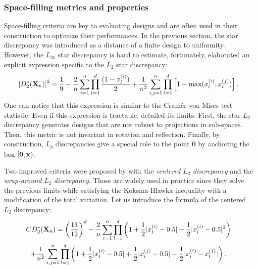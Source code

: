 \subsubsection{Space-filling metrics and properties}
Space-filling criteria are key to evaluating designs and are often used in their construction to optimize their performances. 
In the previous section, the star discrepancy was introduced as a distance of a finite design to uniformity.
However, the $L_\infty$ star discrepancy is hard to estimate, fortunately, \citet{warnock_1972} elaborated an explicit expression specific to the $L_2$ star discrepancy: 
\begin{equation}
    \left[D^*_2({\bf X}_n)\right]^2 = \frac19 - \frac2n \sum_{i=1}^{n} \prod_{l=1}^{d} \frac{(1-x_l^{(i)})}{2} + \frac{1}{n^2}\sum_{i,j=1}^{n} \prod_{l=1}^{d} \left[1 - \max(x_l^{(i)}, x_l^{(j)})\right].
\end{equation}
One can notice that this expression is similar to the Cramér-von Mises test statistic. 
Even if this expression is tractable, \citet{fang_liu_2018} detailed its limits. 
First, the star $L_2$ discrepancy generates designs that are not robust to projections in sub-spaces. 
Then, this metric is not invariant in rotation and reflection. 
Finally, by construction, $L_p$ discrepancies give a special role to the point $\mathbf{0}$ by anchoring the box $[\mathbf{0}, {\bf x})$.

Two improved criteria were proposed by \citet{hickernell_1998} with the \textit{centered $L_2$ discrepancy} and the \textit{wrap-around $L_2$ discrepancy}.
Those are widely used in practice since they solve the previous limits while satisfying the Koksma-Hlawka inequality with a modification of the total variation.
Let us introduce the formula of the centered $L_2$ discrepancy:
\begin{multline} CD^*_2({\bf X}_n)  = \left(\frac{13}{12}\right)^{d} - \frac{2}{n} \sum_{i=1}^{n} \prod_{l=1}^{d} \left( 1 + \frac{1}{2} |x_l^{(i)} - 0.5| - \frac{1}{2} |x_l^{(i)} - 0.5|^2 \right)\\
    + \frac{1}{n^2} \sum_{i,j=1}^{n} \prod_{l=1}^{d} \left( 1 + \frac{1}{2} |x_l^{(i)} - 0.5| + \frac{1}{2} |x_l^{(j)} - 0.5| - \frac{1}{2} |x_l^{(i)} - x_l^{(j)}| \right).
\end{multline}

